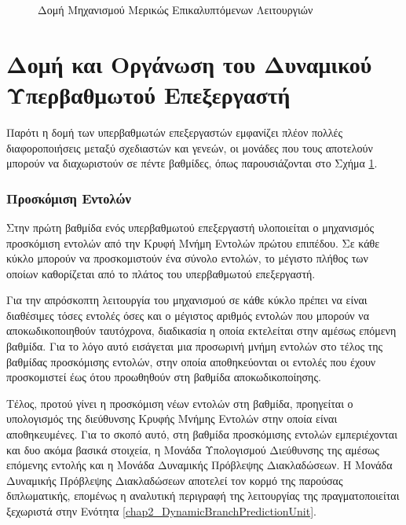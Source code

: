 
\begin{figure}[!h]
    \centering
    \caption{Δομή Μηχανισμού Μερικώς Επικαλυπτόμενων Λειτουργιών}
    \label{fig:chap2_pipeline_stages}
\end{figure}

\section{Δομή και Οργάνωση του Δυναμικού Υπερβαθμωτού Επεξεργαστή}
\label{chap2_Superscalar}

Παρότι η δομή των υπερβαθμωτών επεξεργαστών εμφανίζει πλέον πολλές διαφοροποιήσεις μεταξύ σχεδιαστών και γενεών, οι μονάδες που τους αποτελούν μπορούν να διαχωριστούν σε πέντε βαθμίδες, όπως παρουσιάζονται στο Σχήμα \ref{fig:chap2_pipeline_stages}.

\subsubsection*{Προσκόμιση Εντολών}
\label{chap2_InstructionFetchUnit}

Στην πρώτη βαθμίδα ενός υπερβαθμωτού επεξεργαστή υλοποιείται ο μηχανισμός προσκόμιση εντολών από την Κρυφή Μνήμη Εντολών πρώτου επιπέδου. Σε κάθε κύκλο μπορούν να προσκομιστούν ένα σύνολο εντολών, το μέγιστο πλήθος των οποίων καθορίζεται από το πλάτος του υπερβαθμωτού επεξεργαστή.
\par
Για την απρόσκοπτη λειτουργία του μηχανισμού σε κάθε κύκλο πρέπει να είναι διαθέσιμες τόσες εντολές όσες και ο μέγιστος αριθμός εντολών που μπορούν να αποκωδικοποιηθούν ταυτόχρονα, διαδικασία η οποία εκτελείται στην αμέσως επόμενη βαθμίδα. Για το λόγο αυτό εισάγεται μια προσωρινή μνήμη εντολών στο τέλος της βαθμίδας προσκόμισης εντολών, στην οποία αποθηκεύονται οι εντολές που έχουν προσκομιστεί έως ότου προωθηθούν στη βαθμίδα αποκωδικοποίησης.
\par
Τέλος, προτού γίνει η προσκόμιση νέων εντολών στη βαθμίδα, προηγείται ο υπολογισμός της διεύθυνσης Κρυφής Μνήμης Εντολών στην οποία είναι αποθηκευμένες. Για το σκοπό αυτό, στη βαθμίδα προσκόμισης εντολών εμπεριέχονται και δυο ακόμα βασικά στοιχεία, η Μονάδα Υπολογισμού Διεύθυνσης της αμέσως επόμενης εντολής και η Μονάδα Δυναμικής Πρόβλεψης Διακλαδώσεων. Η Μονάδα Δυναμικής Πρόβλεψης Διακλαδώσεων αποτελεί τον κορμό της παρούσας διπλωματικής, επομένως η αναλυτική περιγραφή της λειτουργίας της πραγματοποιείται ξεχωριστά στην Ενότητα \ref{chap2_DynamicBranchPredictionUnit}.

